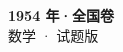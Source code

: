 \documentclass[zihao=-4, a4paper]{ctexart}
\begin{document}
\begin{center}
  {\Large\bfseries 1954 年·全国卷}\\[4pt]
  {\large 数学 · 试题版}
\end{center}
\medskip
{}

\end{document}
